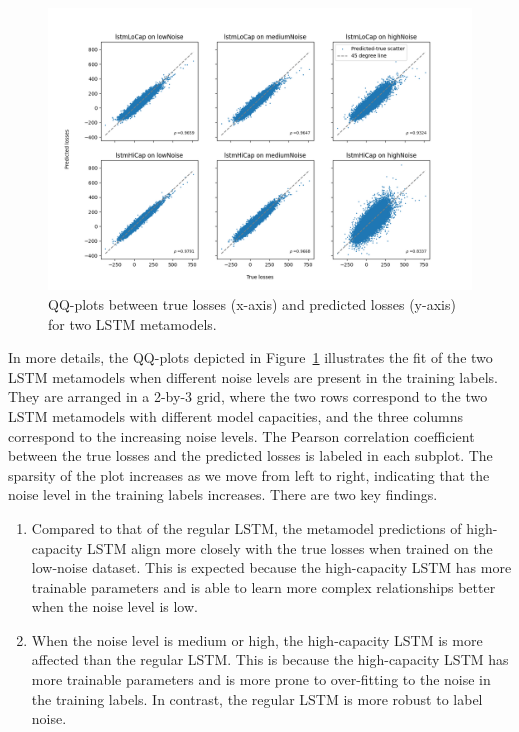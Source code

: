 \begin{figure}[ht!]
    \centering
    \includegraphics[width=\textwidth]{./project2/figures/qqPlots/lstmAll.png}
    \caption{QQ-plots between true losses (x-axis) and predicted losses (y-axis) for two LSTM metamodels.} 
    \label{fig2:QQ_All}
\end{figure}

In more details, the QQ-plots depicted in Figure~\ref{fig2:QQ_All} illustrates the fit of the two LSTM metamodels when different noise levels are present in the training labels.
They are arranged in a 2-by-3 grid, where the two rows correspond to the two LSTM metamodels with different model capacities, and the three columns correspond to the increasing noise levels.
The Pearson correlation coefficient between the true losses and the predicted losses is labeled in each subplot.
The sparsity of the plot increases as we move from left to right, indicating that the noise level in the training labels increases.
There are two key findings.
\begin{enumerate}
    \item   Compared to that of the regular LSTM, the metamodel predictions of high-capacity LSTM align more closely with the true losses when trained on the low-noise dataset.
    This is expected because the high-capacity LSTM has more trainable parameters and is able to learn more complex relationships better when the noise level is low.
    \item   When the noise level is medium or high, the high-capacity LSTM is more affected than the regular LSTM.
    This is because the high-capacity LSTM has more trainable parameters and is more prone to over-fitting to the noise in the training labels.
    In contrast, the regular LSTM is more robust to label noise.
\end{enumerate}

